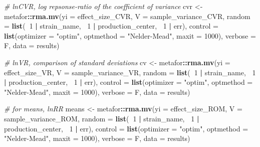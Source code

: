\documentclass[]{article}
\newenvironment{Shaded}{\begin{snugshade}}{\end{snugshade}}
\newcommand{\CommentTok}[1]{\textcolor[rgb]{0.56,0.35,0.01}{\textit{#1}}}
\newcommand{\DataTypeTok}[1]{\textcolor[rgb]{0.13,0.29,0.53}{#1}}
\newcommand{\DecValTok}[1]{\textcolor[rgb]{0.00,0.00,0.81}{#1}}
\newcommand{\KeywordTok}[1]{\textcolor[rgb]{0.13,0.29,0.53}{\textbf{#1}}}
\newcommand{\NormalTok}[1]{#1}
\newcommand{\OperatorTok}[1]{\textcolor[rgb]{0.81,0.36,0.00}{\textbf{#1}}}
\newcommand{\StringTok}[1]{\textcolor[rgb]{0.31,0.60,0.02}{#1}}
\begin{document}
\begin{Shaded}
\begin{Highlighting}[]
{{        \CommentTok{# lnCVR, log repsonse-ratio of the coefficient of variance}
\NormalTok{        cvr <-}\StringTok{ }\NormalTok{metafor}\OperatorTok{::}\KeywordTok{rma.mv}\NormalTok{(}\DataTypeTok{yi =}\NormalTok{ effect_size_CVR, }\DataTypeTok{V =}\NormalTok{ sample_variance_CVR, }\DataTypeTok{random =} \KeywordTok{list}\NormalTok{(}\OperatorTok{~}\DecValTok{1} \OperatorTok{|}\StringTok{ }
\StringTok{            }\NormalTok{strain_name, }\OperatorTok{~}\DecValTok{1} \OperatorTok{|}\StringTok{ }\NormalTok{production_center, }\OperatorTok{~}\DecValTok{1} \OperatorTok{|}\StringTok{ }\NormalTok{err), }\DataTypeTok{control =} \KeywordTok{list}\NormalTok{(}\DataTypeTok{optimizer =} \StringTok{"optim"}\NormalTok{, }
            \DataTypeTok{optmethod =} \StringTok{"Nelder-Mead"}\NormalTok{, }\DataTypeTok{maxit =} \DecValTok{1000}\NormalTok{), }\DataTypeTok{verbose =}\NormalTok{ F, }\DataTypeTok{data =}\NormalTok{ results)}
        
        \CommentTok{# lnVR, comparison of standard deviations}
\NormalTok{        cv <-}\StringTok{ }\NormalTok{metafor}\OperatorTok{::}\KeywordTok{rma.mv}\NormalTok{(}\DataTypeTok{yi =}\NormalTok{ effect_size_VR, }\DataTypeTok{V =}\NormalTok{ sample_variance_VR, }\DataTypeTok{random =} \KeywordTok{list}\NormalTok{(}\OperatorTok{~}\DecValTok{1} \OperatorTok{|}\StringTok{ }
\StringTok{            }\NormalTok{strain_name, }\OperatorTok{~}\DecValTok{1} \OperatorTok{|}\StringTok{ }\NormalTok{production_center, }\OperatorTok{~}\DecValTok{1} \OperatorTok{|}\StringTok{ }\NormalTok{err), }\DataTypeTok{control =} \KeywordTok{list}\NormalTok{(}\DataTypeTok{optimizer =} \StringTok{"optim"}\NormalTok{, }
            \DataTypeTok{optmethod =} \StringTok{"Nelder-Mead"}\NormalTok{, }\DataTypeTok{maxit =} \DecValTok{1000}\NormalTok{), }\DataTypeTok{verbose =}\NormalTok{ F, }\DataTypeTok{data =}\NormalTok{ results)}
        
        \CommentTok{# for means, lnRR}
\NormalTok{        means <-}\StringTok{ }\NormalTok{metafor}\OperatorTok{::}\KeywordTok{rma.mv}\NormalTok{(}\DataTypeTok{yi =}\NormalTok{ effect_size_ROM, }\DataTypeTok{V =}\NormalTok{ sample_variance_ROM, }\DataTypeTok{random =} \KeywordTok{list}\NormalTok{(}\OperatorTok{~}\DecValTok{1} \OperatorTok{|}\StringTok{ }
\StringTok{            }\NormalTok{strain_name, }\OperatorTok{~}\DecValTok{1} \OperatorTok{|}\StringTok{ }\NormalTok{production_center, }\OperatorTok{~}\DecValTok{1} \OperatorTok{|}\StringTok{ }\NormalTok{err), }\DataTypeTok{control =} \KeywordTok{list}\NormalTok{(}\DataTypeTok{optimizer =} \StringTok{"optim"}\NormalTok{, }
            \DataTypeTok{optmethod =} \StringTok{"Nelder-Mead"}\NormalTok{, }\DataTypeTok{maxit =} \DecValTok{1000}\NormalTok{), }\DataTypeTok{verbose =}\NormalTok{ F, }\DataTypeTok{data =}\NormalTok{ results)}
        
}}
\end{Highlighting}
\end{Shaded}
\end{document}
